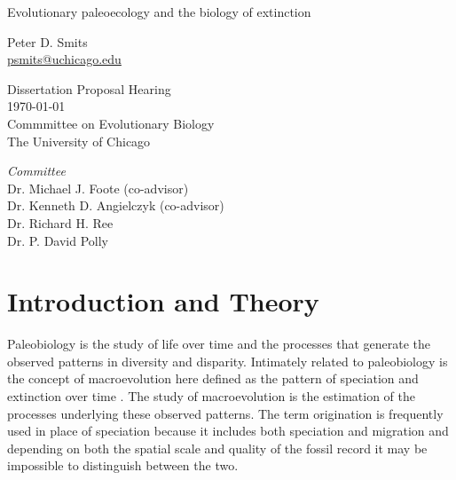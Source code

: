 \documentclass[12pt,letterpaper]{article}
\begin{document}
\setcounter{secnumdepth}{0}

\begin{titlepage}
  \begin{center}
    \huge{Evolutionary paleoecology and the biology of extinction}

    \vspace{1.5cm}

    \large{Peter D. Smits \\}
    \footnotesize{\href{mailto:psmits@uchicago.edu}{psmits@uchicago.edu}}

    \vspace{1.5cm}

    Dissertation Proposal Hearing \\
    \today \\
    Commmittee on Evolutionary Biology \\
    The University of Chicago

    \vspace{1.5cm}

    \textit{Committee} \\
    Dr. Michael J. Foote (co-advisor) \\
    Dr. Kenneth D. Angielczyk (co-advisor) \\
    Dr. Richard H. Ree \\
    Dr. P. David Polly
  \end{center}
\end{titlepage}

\linenumbers
\modulolinenumbers[2]


\section{Introduction and Theory}
Paleobiology is the study of life over time and the processes that generate the observed patterns in diversity and disparity. Intimately related to paleobiology is the concept of macroevolution here defined as the pattern of speciation and extinction over time \citep{Jablonski2008a}. The study of macroevolution is the estimation of the processes underlying these observed patterns. The term origination is frequently used in place of speciation because it includes both speciation and migration and depending on both the spatial scale and quality of the fossil record it may be impossible to distinguish between the two.
\end{document}
